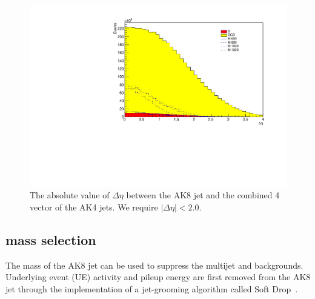 \begin{figure}[thb!]
\begin{center}
\includegraphics[scale=0.34]{F5/shapedeta.pdf}
\end{center}
\caption{The absolute value of $\Delta\eta$ between the AK8 jet and the combined 4 vector of the AK4 jets. We require $|\Delta\eta| < 2.0$.}
\label{fig:deta}
\end{figure} 

\subsection{\texorpdfstring{\PH}{H} mass selection\label{ss:EvtSelMass}}

The mass of the AK8 jet can be used to suppress the multijet and \ttbar backgrounds. Underlying event (UE) activity and pileup energy are first removed from the AK8 jet through the implementation of a jet-grooming algorithm called Soft Drop~\cite{jetpruning1,jetpruning2}. 



